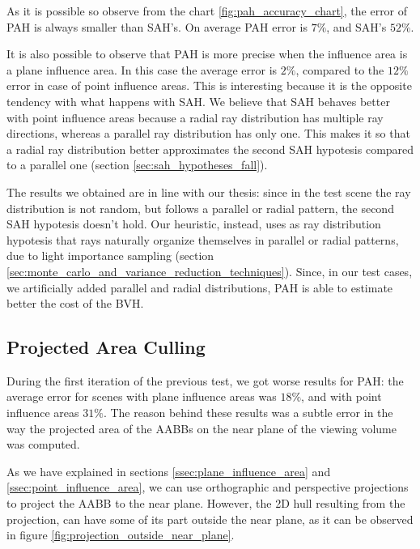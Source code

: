 \documentclass{PoliMi_MasterThesis}
\begin{document}
As it is possible so observe from the chart \ref{fig:pah_accuracy_chart}, the error of PAH is always smaller than SAH's. On average PAH error is $7\%$, and SAH's $52\%$.

It is also possible to observe that PAH is more precise when the influence area is a plane influence area. In this case the average error is $2\%$, compared to the $12\%$ error in case of point influence areas. This is interesting because it is the opposite tendency with what happens with SAH. We believe that SAH behaves better with point influence areas because a radial ray distribution has multiple ray directions, whereas a parallel ray distribution has only one. This makes it so that a radial ray distribution better approximates the second SAH hypotesis compared to a parallel one (section \ref{sec:sah_hypotheses_fall}).

The results we obtained are in line with our thesis: since in the test scene the ray distribution is not random, but follows a parallel or radial pattern, the second SAH hypotesis doesn't hold. Our heuristic, instead, uses as ray distribution hypotesis that rays naturally organize themselves in parallel or radial patterns, due to light importance sampling (section \ref{sec:monte_carlo_and_variance_reduction_techniques}). Since, in our test cases, we artificially added parallel and radial distributions, PAH is able to estimate better the cost of the BVH.

\subsection{Projected Area Culling} \label{ssec:projected_area_culling}
During the first iteration of the previous test, we got worse results for PAH: the average error for scenes with plane influence areas was $18\%$, and with point influence areas $31\%$. The reason behind these results was a subtle error in the way the projected area of the AABBs on the near plane of the viewing volume was computed.

As we have explained in sections \ref{ssec:plane_influence_area} and \ref{ssec:point_influence_area}, we can use orthographic and perspective projections to project the AABB to the near plane. However, the 2D hull resulting from the projection, can have some of its part outside the near plane, as it can be observed in figure \ref{fig:projection_outside_near_plane}. 
\end{document}

